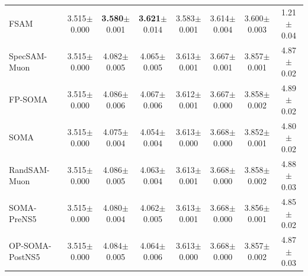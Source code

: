 \begin{table}[t]
{\begin{tabular}{lccccccc}
    FSAM & 3.515{\scriptsize$\pm$0.000} & \textbf{3.580}{\scriptsize$\pm$0.001} & \textbf{3.621}{\scriptsize$\pm$0.014} & 3.583{\scriptsize$\pm$0.001} & 3.614{\scriptsize$\pm$0.004} & 3.600{\scriptsize$\pm$0.003} & 1.21{\scriptsize$\pm$0.04} \\
    SpecSAM-Muon & 3.515{\scriptsize$\pm$0.000} & 4.082{\scriptsize$\pm$0.005} & 4.065{\scriptsize$\pm$0.005} & 3.613{\scriptsize$\pm$0.001} & 3.667{\scriptsize$\pm$0.001} & 3.857{\scriptsize$\pm$0.001} & 4.87{\scriptsize$\pm$0.02} \\
    FP-SOMA & 3.515{\scriptsize$\pm$0.000} & 4.086{\scriptsize$\pm$0.006} & 4.067{\scriptsize$\pm$0.006} & 3.612{\scriptsize$\pm$0.001} & 3.667{\scriptsize$\pm$0.000} & 3.858{\scriptsize$\pm$0.002} & 4.89{\scriptsize$\pm$0.02} \\
    SOMA & 3.515{\scriptsize$\pm$0.000} & 4.075{\scriptsize$\pm$0.004} & 4.054{\scriptsize$\pm$0.004} & 3.613{\scriptsize$\pm$0.000} & 3.668{\scriptsize$\pm$0.000} & 3.852{\scriptsize$\pm$0.001} & 4.80{\scriptsize$\pm$0.02} \\
    RandSAM-Muon & 3.515{\scriptsize$\pm$0.000} & 4.086{\scriptsize$\pm$0.005} & 4.063{\scriptsize$\pm$0.004} & 3.613{\scriptsize$\pm$0.001} & 3.668{\scriptsize$\pm$0.000} & 3.858{\scriptsize$\pm$0.002} & 4.88{\scriptsize$\pm$0.03} \\
    SOMA-PreNS5 & 3.515{\scriptsize$\pm$0.000} & 4.080{\scriptsize$\pm$0.004} & 4.062{\scriptsize$\pm$0.005} & 3.613{\scriptsize$\pm$0.001} & 3.668{\scriptsize$\pm$0.000} & 3.856{\scriptsize$\pm$0.001} & 4.85{\scriptsize$\pm$0.02} \\
    OP-SOMA-PostNS5 & 3.515{\scriptsize$\pm$0.000} & 4.084{\scriptsize$\pm$0.005} & 4.064{\scriptsize$\pm$0.006} & 3.613{\scriptsize$\pm$0.000} & 3.668{\scriptsize$\pm$0.000} & 3.857{\scriptsize$\pm$0.002} & 4.87{\scriptsize$\pm$0.03} \\
    \bottomrule
  \end{tabular}}
\end{table}
